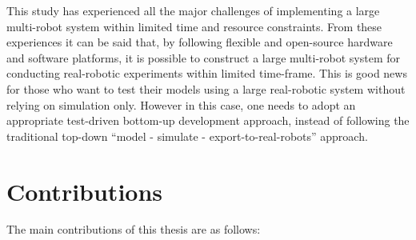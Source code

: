 This study has experienced all the major challenges of implementing a large multi-robot system within limited time and resource constraints. From these experiences it can be said that, by following flexible and open-source hardware and software platforms, it is possible to construct a large multi-robot system for conducting real-robotic experiments within limited time-frame. This is good news for those who want to test their models using a large real-robotic system without relying on simulation only. However in this case, one needs to adopt an appropriate test-driven bottom-up development approach, instead of following the traditional top-down ``model - simulate -  export-to-real-robots'' approach. 
\section{Contributions}
The main contributions of this thesis are as follows:
